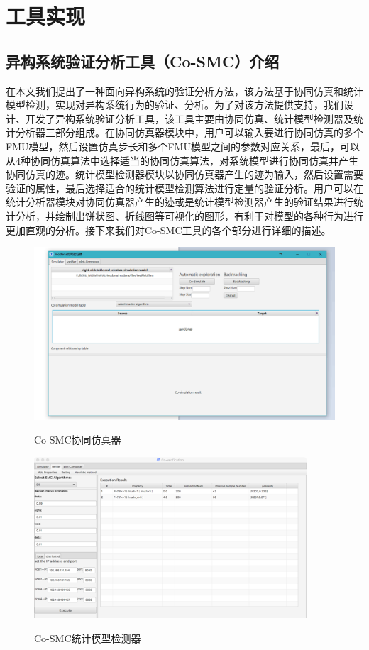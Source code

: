 \chapter{工具实现}
\label{ch5}

\section{异构系统验证分析工具（Co-SMC）介绍}
在本文我们提出了一种面向异构系统的验证分析方法，该方法基于协同仿真和统计模型检测，实现对异构系统行为的验证、分析。为了对该方法提供支持，我们设计、开发了异构系统验证分析工具，该工具主要由协同仿真、统计模型检测器及统计分析器三部分组成。在协同仿真器模块中，用户可以输入要进行协同仿真的多个FMU模型，然后设置仿真步长和多个FMU模型之间的参数对应关系，最后，可以从4种协同仿真算法中选择适当的协同仿真算法，对系统模型进行协同仿真并产生协同仿真的迹。统计模型检测器模块以协同仿真器产生的迹为输入，然后设置需要验证的属性，最后选择适合的统计模型检测算法进行定量的验证分析。用户可以在统计分析器模块对协同仿真器产生的迹或是统计模型检测器产生的验证结果进行统计分析，并绘制出饼状图、折线图等可视化的图形，有利于对模型的各种行为进行更加直观的分析。接下来我们对Co-SMC工具的各个部分进行详细的描述。
\begin{figure}[htbp]
	\centering
	{\includegraphics[width=6.0in]{fig/5/tool4.png}}
	\caption{Co-SMC协同仿真器}\label{tool-1}
\end{figure}
\begin{figure}[htbp]
	\centering
	{\includegraphics[width=4.0in]{fig/5/tool2.png}}
	\caption{Co-SMC统计模型检测器}\label{tool-2}
\end{figure}
